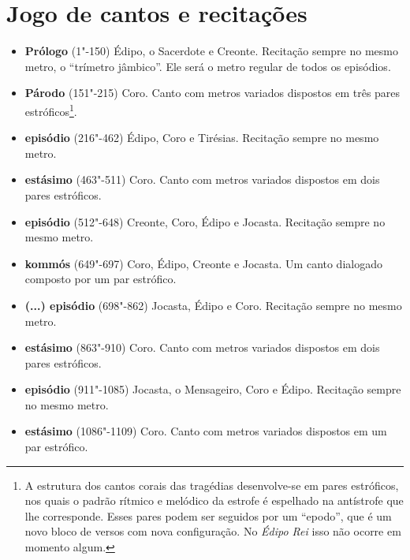 \section{Jogo de cantos e recitações}

\begin{itemize}
\item \textbf{Prólogo} (1"-150)  
 {Édipo, o Sacerdote e Creonte}. Recitação sempre no mesmo metro, o ``trímetro jâmbico''. Ele será o metro regular de todos os episódios. 

\item \textbf{Párodo} (151"-215)
 {Coro}. Canto com metros variados dispostos em três pares estróficos\footnote{ A estrutura dos cantos corais das tragédias desenvolve-se em pares estróficos, nos quais o padrão rítmico e melódico da estrofe é espelhado na antístrofe que lhe corresponde. Esses pares podem ser seguidos por um ``epodo'', que é um novo bloco de versos com nova configuração. No \emph{Édipo Rei} isso não ocorre em momento algum.}. 

\item \textbf{ episódio} (216"-462)        
	 {Édipo, Coro e Tirésias}. Recitação sempre no mesmo metro. 

\item \textbf{ estásimo} (463"-511)     
	 {Coro}. Canto com metros variados dispostos em dois pares estróficos. 

\item \textbf{ episódio} (512"-648)         
	 {Creonte, Coro, Édipo e Jocasta}. Recitação sempre no mesmo metro.  

\item \textbf{ kommós} (649"-697)   
	 {Coro, Édipo, Creonte e Jocasta}. Um canto dialogado composto por um par estrófico. 

\item \textbf{(...)  episódio} (698"-862)
	 {Jocasta, Édipo e Coro}. Recitação sempre no mesmo metro. 

\item \textbf{ estásimo} (863"-910)         
	 {Coro}. Canto com metros variados dispostos em dois pares estróficos. 

\item \textbf{ episódio} (911"-1085)       
	 {Jocasta, o Mensageiro, Coro e Édipo}. Recitação sempre no mesmo metro. 

\item \textbf{ estásimo} (1086"-1109)      
	 {Coro}. Canto com metros variados dispostos em um par estrófico. 


\end{itemize}
